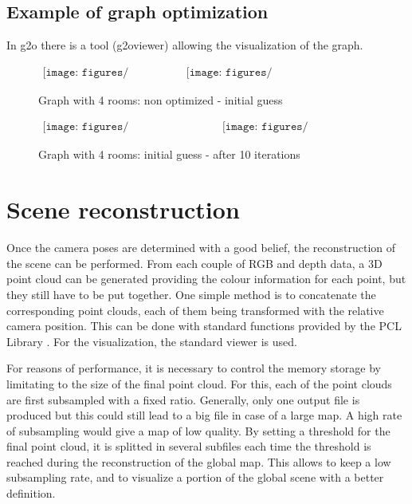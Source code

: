\section{Example of graph optimization}
In g2o there is a tool (g2oviewer) allowing the visualization of the graph.

\begin{figure}[h]
\centering$
\begin{array}{cc}
\texttt{[image: figures/graph4\_base]} &
\texttt{[image: figures/graph4\_initial\_guess]}
\end{array}$
\caption{Graph with 4 rooms: non optimized - initial guess}
\end{figure}
\begin{figure}[h]
\centering$
\begin{array}{cc}
\texttt{[image: figures/graph4\_initial\_guess]} &
\texttt{[image: figures/graph4\_optimized]}
\end{array}$
\caption{Graph with 4 rooms: initial guess - after 10 iterations}
\end{figure}

\clearpage

\chapter{Scene reconstruction}
\label{chap:reconstruction}

Once the camera poses are determined with a good belief, the reconstruction of the scene can be performed. From each couple of RGB and depth data, a 3D point cloud can be generated providing the colour information for each point, but they still have to be put together. One simple method is to concatenate the corresponding point clouds, each of them being transformed with the relative camera position. This can be done with standard functions provided by the PCL Library \cite{Rusu_ICRA2011_PCL}. For the visualization, the standard viewer is used.

For reasons of performance, it is necessary to control the memory storage by limitating to the size of the final point cloud. For this, each of the point clouds are first subsampled with a fixed ratio. Generally, only one output file is produced but this could still lead to a big file in case of a large map. A high rate of subsampling would give a map of low quality. By setting a threshold for the final point cloud, it is splitted in several subfiles each time the threshold is reached during the reconstruction of the global map. This allows to keep a low subsampling rate, and to visualize a portion of the global scene with a better definition.

